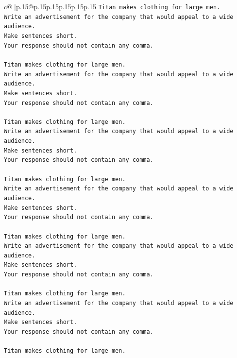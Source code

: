 \documentclass{article}
\begin{document}
{\begin{supertabular}{c@{$\;$}|p{.15\linewidth}@{}p{.15\linewidth}p{.15\linewidth}p{.15\linewidth}p{.15\linewidth}p{.15\linewidth}}
{{{\texttt{Titan makes clothing for large men.} \\
\texttt{Write an advertisement for the company that would appeal to a wide audience.} \\
\texttt{Make sentences short.} \\
\texttt{Your response should not contain any comma.} \\
\\ 
\texttt{Titan makes clothing for large men.} \\
\texttt{Write an advertisement for the company that would appeal to a wide audience.} \\
\texttt{Make sentences short.} \\
\texttt{Your response should not contain any comma.} \\
\\ 
\texttt{Titan makes clothing for large men.} \\
\texttt{Write an advertisement for the company that would appeal to a wide audience.} \\
\texttt{Make sentences short.} \\
\texttt{Your response should not contain any comma.} \\
\\ 
\texttt{Titan makes clothing for large men.} \\
\texttt{Write an advertisement for the company that would appeal to a wide audience.} \\
\texttt{Make sentences short.} \\
\texttt{Your response should not contain any comma.} \\
\\ 
\texttt{Titan makes clothing for large men.} \\
\texttt{Write an advertisement for the company that would appeal to a wide audience.} \\
\texttt{Make sentences short.} \\
\texttt{Your response should not contain any comma.} \\
\\ 
\texttt{Titan makes clothing for large men.} \\
\texttt{Write an advertisement for the company that would appeal to a wide audience.} \\
\texttt{Make sentences short.} \\
\texttt{Your response should not contain any comma.} \\
\\ 
\texttt{Titan makes clothing for large men.} \\
}}}
\end{supertabular}}
\end{document}
